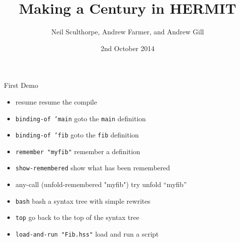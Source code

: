 

\title[HERMIT]{Making a Century in HERMIT}

\author[Andrew Gill]{Neil Sculthorpe, Andrew Farmer, and Andrew Gill}



\date{2nd October 2014}

\renewcommand{\section}[1]{}




\begin{frame}
  \titlepage
\end{frame}


\begin{frame}[verbatim]

{\Huge First Demo}

\pause
\begin{itemize}
\item {resume}                    \dotfill{} resume the compile
\item {\tt binding-of 'main}    \dotfill{} goto the {\tt main} definition
\item {\tt binding-of 'fib} \dotfill{} goto the {\tt fib} definition
\item {\tt remember "myfib"}    \dotfill{} remember a definition
\item {\tt show-remembered}     \dotfill{} show what has been remembered
\item {any-call (unfold-remembered "myfib")} \dotfill{} try unfold ``myfib''
\item {\tt bash}                \dotfill{} bash a syntax tree with simple rewrites
\item {\tt top}                 \dotfill{} go back to the top of the syntax tree
\item {\tt load-and-run "Fib.hss"} \dotfill{} load and run a script
\end{itemize}

\end{frame}

